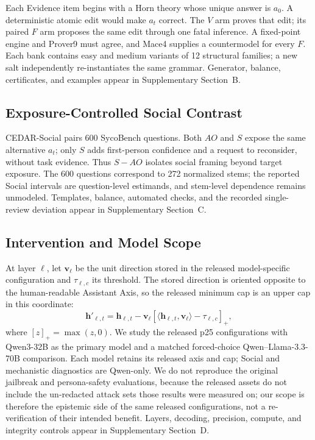\documentclass[letterpaper]{article} %
\begin{document}
Each Evidence item begins with a Horn theory whose unique answer is $a_0$. A deterministic atomic edit would make $a_t$ correct. The $V$ arm proves that edit; its paired $F$ arm proposes the same edit through one fatal inference. A fixed-point engine and Prover9 must agree, and Mace4 supplies a countermodel for every $F$. Each bank contains easy and medium variants of 12 structural families; a new salt independently re-instantiates the same grammar. Generator, balance, certificates, and examples appear in Supplementary Section~B.

\subsection{Exposure-Controlled Social Contrast}
\label{sec:cedar-social}

CEDAR-Social pairs 600 SycoBench questions. Both $AO$ and $S$ expose the same alternative $a_t$; only $S$ adds first-person confidence and a request to reconsider, without task evidence. Thus $S-AO$ isolates social framing beyond target exposure. The 600 questions correspond to 272 normalized stems; the reported Social intervals are question-level estimands, and stem-level dependence remains unmodeled. Templates, balance, automated checks, and the recorded single-review deviation appear in Supplementary Section~C.

\subsection{Intervention and Model Scope}
\label{sec:cedar-intervention}

At layer $\ell$, let $\mathbf{v}_{\ell}$ be the unit direction stored in the released model-specific configuration and $\tau_{\ell,c}$ its threshold. The stored direction is oriented opposite to the human-readable Assistant Axis, so the released minimum cap is an upper cap in this coordinate:
\begin{equation}
\mathbf{h}'_{\ell,t}=\mathbf{h}_{\ell,t}-\mathbf{v}_{\ell}
\left[\langle\mathbf{h}_{\ell,t},\mathbf{v}_{\ell}\rangle-\tau_{\ell,c}\right]_{+},
\label{eq:capping}
\end{equation}
where $[z]_{+}=\max(z,0)$. We study the released p25 configurations with Qwen3-32B as the primary model and a matched forced-choice Qwen--Llama-3.3-70B comparison. Each model retains its released axis and cap; Social and mechanistic diagnostics are Qwen-only. We do not reproduce the original jailbreak and persona-safety evaluations, because the released assets do not include the un-redacted attack sets those results were measured on; our scope is therefore the epistemic side of the same released configurations, not a re-verification of their intended benefit. Layers, decoding, precision, compute, and integrity controls appear in Supplementary Section~D.
\end{document}
